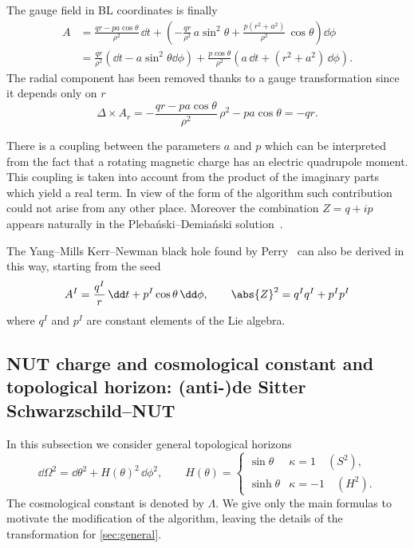 The gauge field in BL coordinates is finally
\begin{subequations}
\begin{align}
	A &= \frac{q r - p a \cos \theta}{\rho^2}\, \dd t
			+ \left(- \frac{q r}{\rho^2}\, a \sin^2 \theta + \frac{p(r^2 + a^2)}{\rho^2}\, \cos\theta \right) \dd\phi \\
		&= \frac{q r}{\rho^2} (\dd t - a \sin^2 \theta \dd\phi)
			+ \frac{p \cos \theta}{\rho^2} \left(a\, \dd t + (r^2 + a^2)\, \dd\phi \right).
\end{align}
\end{subequations}
The radial component has been removed thanks to a gauge transformation since it depends only on $r$
\begin{equation}
	\Delta \times A_r = - \frac{q r - p a \cos \theta}{\rho^2}\, \rho^2 - p a \cos \theta
		= - q r.
\end{equation} 

There is a coupling between the parameters $a$ and $p$ which can be interpreted from the fact that a rotating magnetic charge has an electric quadrupole moment.
This coupling is taken into account from the product of the imaginary parts which yield a real term.
In view of the form of the algorithm such contribution could not arise from any other place.
Moreover the combination $Z = q + i p$ appears naturally in the Plebański--Demiański solution~\cite{Plebanski:1975:ClassSolutionsEinsteinMaxwell, Plebanski:1976:RotatingChargedUniformly}.

The Yang--Mills Kerr--Newman black hole found by Perry~\cite{Perry:1977:BlackHolesAre} can also be derived in this way, starting from the seed
\begin{equation}
	A^I = \frac{q^I}{r}\, \dd t + p^I \cos \theta\, \dd\phi, \qquad
	\abs{Z}^2 = q^I q^I + p^I p^I
\end{equation} 
where $q^I$ and $p^I$ are constant elements of the Lie algebra.


\subsection[NUT charge, cosmological constant and topological horizon: (anti-)de Sitter Schwarzschild--NUT]
{NUT charge and cosmological constant and topological horizon: (anti-)de Sitter Schwarzschild--NUT}
\label{sec:extension:nut}


In this subsection we consider general topological horizons
\begin{equation}
	\dd \Omega^2 = \dd\theta^2 + H(\theta)^2\, \dd \phi^2, \qquad
	H(\theta) =
	\begin{cases}
		\sin \theta & \kappa = 1 \quad (S^2), \\
		\sinh \theta & \kappa = -1 \quad (H^2).
	\end{cases}
\end{equation} 
The cosmological constant is denoted by $\Lambda$.
We give only the main formulas to motivate the modification of the algorithm, leaving the details of the transformation for \cref{sec:general}.

